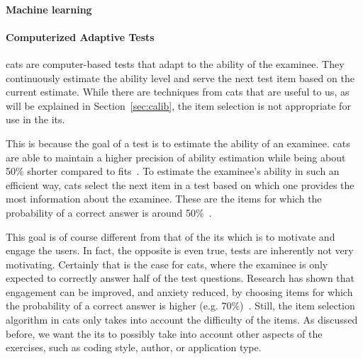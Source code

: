 \paragraph{Machine learning}

\paragraph{Computerized Adaptive Tests}
\Glspl{cat} are computer-based tests that adapt to the ability of the examinee. 
They continuously estimate the ability level and serve the next test item based on the current estimate.
While there are techniques from \glspl{cat} that are useful to us, as will be explained in Section~\ref{sec:calib}, the item selection is not appropriate for use in the \gls{its}.

This is because the goal of a test is to estimate the ability of an examinee. \Glspl{cat} are able to maintain a higher precision of ability estimation while being about 50\% shorter compared to \glspl{fit}~\cite{weiss1984application}.
To estimate the examinee's ability in such an efficient way, \glspl{cat} select the next item in a test based on which one provides the most information about the examinee. 
These are the items for which the probability of a correct answer is around 50\%~\cite{magis2017computerized, ling2017computerized}.

This goal is of course different from that of the \gls{its} which is to motivate and engage the users. 
In fact, the opposite is even true, tests are inherently not very motivating.
Certainly that is the case for \glspl{cat}, where the examinee is only expected to correctly answer half of the test questions.
Research has shown that engagement can be improved, and anxiety reduced, by choosing items for which the probability of a correct answer is higher (e.g. 70\%)~\cite{ling2017computerized}. 
Still, the item selection algorithm in \glspl{cat} only takes into account the difficulty of the items. 
As discussed before, we want the \gls{its} to possibly take into account other aspects of the exercises, such as coding style, author, or application type.